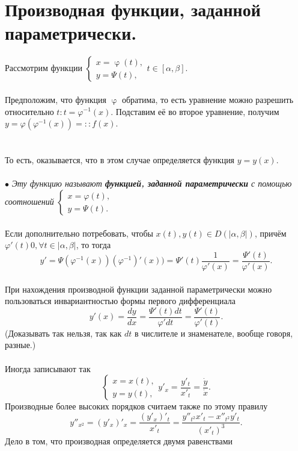\section{Производная функции, заданной параметрически.}
Рассмотрим функции
$\begin{cases}
	x = \upvarphi(t), \\
	y = \Psi(t),
\end{cases}   t \in [\alpha,\beta].$   \\\\
Предположим, что функция $\upvarphi$ обратима, то есть уравнение можно разрешить относительно $t : t = \varphi ^{-1}(x)$. Подставим её во второе уравнение, получим $ y = \varphi (\varphi ^{-1}(x)) = :: f(x)$.\\\\
\\То есть, оказывается, что в этом случае определяется функция $y = y(x)$.\\\\
$\bullet$\textit{ Эту функцию называют \textbf{функцией, заданной параметрически} с помощью соотношений }
$\begin{cases} 
	x = \varphi (t), \\
	y = \Psi(t).
\end{cases}$ \\\\
Если дополнительно потребовать, чтобы $x(t), y(t) \in D(|\alpha,\beta|)$, причём $\varphi '(t)  0, \forall t \in |\alpha,\beta|$, то тогда  
$$y' = \Psi(\varphi ^{-1}(x))(\varphi ^{-1})'(x)) = \Psi'(t)\frac{1}{\varphi'(x)} = \frac{\Psi'(t)}{\varphi '(x)}.$$
\\При нахождения производной функции заданной параметрически можно пользоваться инвариантностью формы первого дифференциала \\
$$y'(x) = \frac{dy}{dx} = \frac{\Psi'(t)dt}{\varphi 'dt} = \frac{\Psi'(t)}{\varphi'(t)}.$$
(Доказывать так нельзя, так как $dt$ в числителе и знаменателе, вообще говоря, разные.) \\\\
Иногда записывают так 
$$\begin{cases}
	x = x(t), \\
	y = y(t),
\end{cases}   y'_x  = \frac{y'_t}{x'_t} = \frac{\dot y}{\dot x}.$$
Производные более высоких порядков считаем также по этому правилу
$$y''_{x^2} = (y'_x)'_x = \frac{(y'_x)'_t}{x'_t} = \frac{y''_{t^2}x'_t - x''_{t^2}y'_t}{(x'_t)^3}.$$
Дело в том, что производная определяется двумя равенствами  
